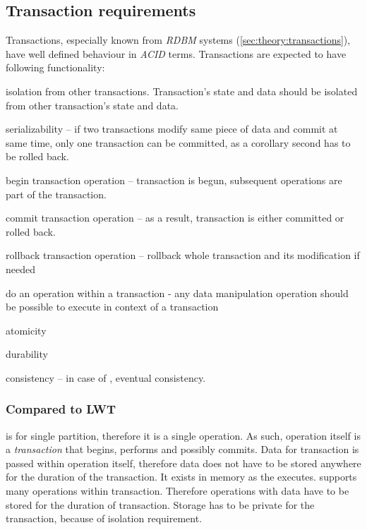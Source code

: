\subsection{Transaction requirements}
Transactions, especially known from \emph{RDBM} systems (\ref{sec:theory:transactions}), have well defined behaviour in \emph{ACID} terms. Transactions are expected to have following functionality:
\begin{enumerate*}
\item isolation from other transactions. Transaction's state and data should be isolated from other transaction's state and data.
\item serializability -- if two transactions modify same piece of data and commit at same time, only one transaction can be committed, as a corollary second has to be rolled back.
\item begin transaction operation -- transaction is begun, subsequent operations are part of the transaction. 
\item commit transaction operation -- as a result, transaction is either committed or rolled back.
\item rollback transaction operation -- rollback whole transaction and its modification if needed
\item do an operation within a transaction - any data manipulation operation should be possible to execute in context of a transaction
\item atomicity
\item durability
\item consistency -- in case of \mpp, eventual consistency.
\end{enumerate*}

\subsubsection{Compared to LWT}
\lwt is for single partition, therefore it is a single operation. As such, operation itself is a \emph{transaction} that begins, performs and possibly commits. Data for \lwt transaction is passed within operation itself, therefore data does not have to be stored anywhere for the duration of the transaction. It exists in memory as the \lwt executes.
\mpp supports many operations within transaction. Therefore operations with data have to be stored for the duration of transaction. Storage has to be private for the transaction, because of isolation requirement.


